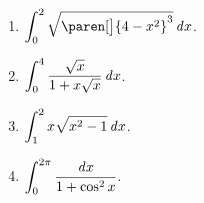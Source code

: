 \documentclass[a4paper,punct=CCT]{ctexbook}
\theoremstyle{definition}
\theoremstyle{remark}
\newif\ifshowsol
\begin{document}
\begin{enumerate}
\item \(\displaystyle \int_0^2 \sqrt{\paren[\big]{4-x^2}^3} \dx\).

  \ifshowsol
  用\(x = 2 \sin t\)做换元, 有
  \[
    \begin{split}
      \int_0^{\pi/2} \sqrt{\paren[\big]{4-x^2}^3} \dx
      &= 16 \int_0^{\pi/2} \cos^4 t \dt
      = 4 \int_0^{\pi/2} \paren[\big]{1 + \cos 2t}^2 \dt \\
      &= 4 \int_0^{\pi/2} \paren{1 + 2 \cos 2t + \cos^2 2t} \dt \\
      &= 4 \paren[\bigg]{\frac{\pi}{2} + \sin 2t \Big\vert_0^{\pi/2} + \frac12 \int_0^\pi \cos^2 u \du} \\
      &= 2 \pi + \int_0^\pi \paren{1 + \cos 2u} \du \\
      &= 2 \pi + \pi + \frac{\sin 2u}{2} \bigg\vert_0^\pi
      = 3 \pi.
    \end{split}
  \]
  \fi
\item \(\displaystyle \int_0^4 \frac{\sqrt x}{1 + x \sqrt{x}} \mathop{}\!\mathit{d} x\).

  \ifshowsol
  用\(t = \sqrt x\)做换元, 有
  \[
    \begin{split}
      \int_0^4 \frac{\sqrt x}{1 + x \sqrt{x}} \dx
      = \int_0^2 \frac{t}{1+t^3} \cdot 2t \dt
      = \frac23 \int_0^2 \frac{\diff(t^3)}{1+t^3}
      = \frac23 \ln(1+t^3) \Big\vert_0^2
      = \frac23 \ln9
      = \frac43 \ln3.
    \end{split}
  \]
  \fi

\item \(\displaystyle \int_1^2 x \sqrt{x^2 - 1} \mathop{}\!\mathit{d} x\).

  \ifshowsol
  用\(x = \cosh t\)做换元, 有
  \[
    \int_1^2 x \sqrt{x^2 - 1} \dx
    = \int_0^{\arccosh2} \sinh^2 t \cosh t \dt
    = \int_0^{\sinh\arccosh2} u^2 \du
    = \frac{u^3}{3} \bigg\vert_0^{\sqrt3}
    = \sqrt3.
  \]
  其中
  \[
    \sinh\arccosh2 = \sqrt{\cosh^2 \arccosh 2 - 1} = \sqrt{2^2 - 1} = \sqrt3.
  \]
  或者用\(x = \sec t\)做换元, 有
  \[
    \int_1^2 x \sqrt{x^2 - 1} \dx
    = \int_0^{\pi/3} \tan^2 t \sec^2 t \dt
    = \int_0^{\sqrt3} u^2 \du
    = \frac{u^3}{3} \bigg\vert_0^{\sqrt3}
    = \sqrt3.
  \]
  \fi

\item \(\displaystyle \int_0^{2\pi} \frac{\mathop{}\!\mathit{d} x}{1 + \cos^2 x}\).

  \ifshowsol
  先将被积函数降次, 然后把积分上下限变换到最小的范围, 最后用\(t = \tan \frac x2\)做换元, 有
  \[
    \begin{split}
      \int_0^{2\pi} \frac{\dx}{1 + \cos^2 x}
      &= \int_0^{2\pi} \frac{2}{3 + \cos 2x} \dx
      = \int_0^{4\pi} \frac{\dx}{3 + \cos x}
      = 2 \int_0^{2\pi} \frac{\dx}{3 + \cos x} \\
      &= 2 \int_{-\pi}^{\pi} \frac{\dx}{3 - \cos x}
      = 4 \int_0^{\pi} \frac{\dx}{3 - \cos x} \\
      &= 4 \int_0^{+\infty} \frac{1}{3 - \paren{1-t^2}/\paren{1+t^2}} \frac{2}{1+t^2} \dt
      = 4 \int_0^{+\infty} \frac{\dt}{1 + 2t^2} \\
      &= \frac{4}{\sqrt2} \arctan \sqrt2 t \bigg\vert_0^{+\infty}
      = \sqrt2 \pi.
    \end{split}
  \]
  \fi


\end{enumerate}
\end{document}
